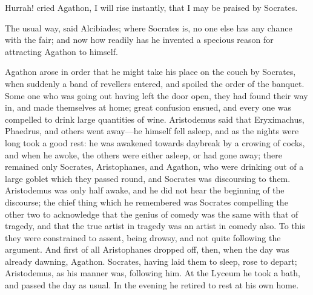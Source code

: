 \para[160] Hurrah! cried Agathon, I will rise instantly, that I may be praised by Socrates.

\para[161] The usual way, said Alcibiades; where Socrates is, no one else has any chance with the fair; and now how readily has he invented a specious reason for attracting Agathon to himself.

\para[162] Agathon arose in order that he might take his place on the couch by Socrates, when suddenly a band of revellers entered, and spoiled the order of the banquet. Some one who was going out having left the door open, they had found their way in, and made themselves at home; great confusion ensued, and every one was compelled to drink large quantities of wine. Aristodemus said that Eryximachus, Phaedrus, and others went away---he himself fell asleep, and as the nights were long took a good rest: he was awakened towards daybreak by a crowing of cocks, and when he awoke, the others were either asleep, or had gone away; there remained only Socrates, Aristophanes, and Agathon, who were drinking out of a large goblet which they passed round, and Socrates was discoursing to them. Aristodemus was only half awake, and he did not hear the beginning of the discourse; the chief thing which he remembered was Socrates compelling the other two to acknowledge that the genius of comedy was the same with that of tragedy, and that the true artist in tragedy was an artist in comedy also. To this they were constrained to assent, being drowsy, and not quite following the argument. And first of all Aristophanes dropped off, then, when the day was already dawning, Agathon. Socrates, having laid them to sleep, rose to depart; Aristodemus, as his manner was, following him. At the Lyceum he took a bath, and passed the day as usual. In the evening he retired to rest at his own home.

